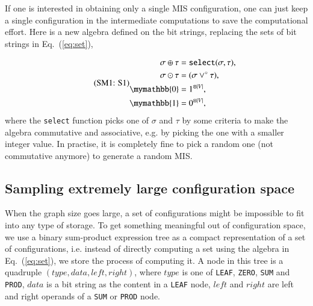 \documentclass[onefignum, onetabnum]{siamart190516}
\newcommand{\eqname}[1]{\stepcounter{equation}\tag{\theequation : #1}}
\newcommand{\<}{\langle}
\renewcommand{\>}{\rangle}
\newcommand{\Eq}[1]{Eq.~(\ref{#1})}
\begin{document}
If one is interested in obtaining only a single MIS configuration, one can just keep a single configuration in the intermediate computations to save the computational effort.
Here is a new algebra defined on the bit strings, replacing the sets of bit strings in \Eq{eq:set}, 

\begin{equation}
\eqname{S1}
\begin{split}
    \sigma \oplus \tau &= \texttt{select}(\sigma, \tau), \\
    \sigma \odot \tau &= (\sigma\lor^\circ \tau),\\
    \mymathbb{0} &= 1^{\otimes |V|}, \\
    \mymathbb{1} &= 0^{\otimes |V|},
\end{split}\label{eq:singleconfig}
\end{equation}
where the \texttt{select} function picks one of $\sigma$ and $\tau$ by some criteria to make the algebra commutative and associative, e.g. by picking the one with a smaller integer value. In practise, it is completely fine to pick a random one (not commutative anymore) to generate a random MIS.

\subsection{Sampling extremely large configuration space}
When the graph size goes large, a set of configurations might be impossible to fit into any type of storage.
To get something meaningful out of configuration space, we use a binary sum-product expression tree as a compact representation of a set of configurations, i.e. instead of directly computing a set using the algebra in \Eq{eq:set}, we store the process of computing it.
A node in this tree is a quadruple $(type, data, left, right)$, where $type$ is one of
\texttt{LEAF}, \texttt{ZERO}, \texttt{SUM} and \texttt{PROD}, $data$ is a bit string as the content in a \texttt{LEAF} node,
$left$ and $right$ are left and right operands of a \texttt{SUM} or \texttt{PROD} node.
\end{document}
